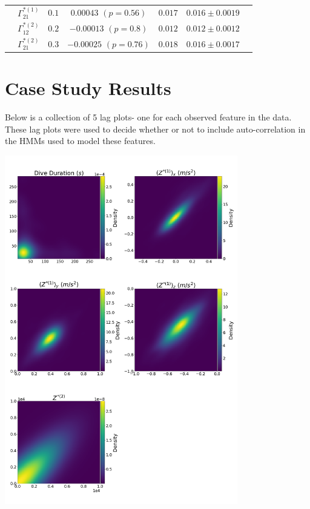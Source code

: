 \documentclass[12pt]{TD-CJS}
\begin{document}
{\begin{tabular}{ccccccc}
                             & $\Gamma^{*(1)}_{21}$          & $0.1$                         & $0.00043$ $(p=0.56)$        & $0.017$                           & $0.016 \pm 0.0019$                             \\
                             & $\Gamma^{*(2)}_{12}$          & $0.2$                         & $-0.00013$ $(p=0.8)$        & $0.012$                           & $0.012 \pm 0.0012$                             \\
                             & $\Gamma^{*(2)}_{21}$          & $0.3$                         & $-0.00025$ $(p=0.76)$        & $0.018$                           & $0.016 \pm 0.0017$                             \\ \hline

\end{tabular}
}

\newpage

\section{Case Study Results}

Below is a collection of 5 lag plots- one for each observed feature in the data. These lag plots were used to decide whether or not to include auto-correlation in the HMMs used to model these features.

\includegraphics[height=6in]{../Plots/CarHHMM2_lagplot.png}
\newpage
\end{document}
